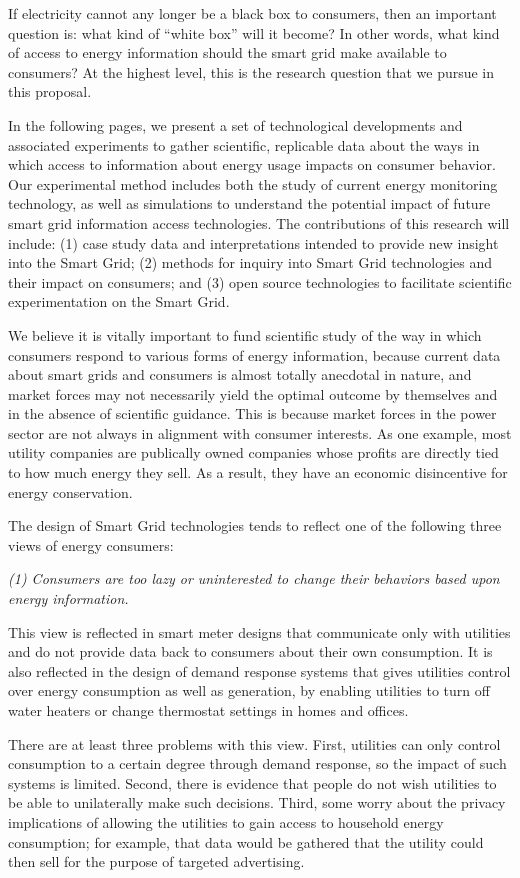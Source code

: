 If electricity cannot any longer be a black box to consumers, then an
important question is: what kind of ``white box'' will it become? In other
words, what kind of access to energy information should the smart grid make
available to consumers? At the highest level, this is the research question
that we pursue in this proposal.

In the following pages, we present a set of technological developments and
associated experiments to gather scientific, replicable data about the ways
in which access to information about energy usage impacts on consumer
behavior.  Our experimental method includes both the study of current
energy monitoring technology, as well as simulations to understand the
potential impact of future smart grid information access technologies.  The
contributions of this research will include: (1) case study data and
interpretations intended to provide new insight into the Smart Grid; (2)
methods for inquiry into Smart Grid technologies and their impact on
consumers; and (3) open source technologies to facilitate scientific
experimentation on the Smart Grid.

We believe it is vitally important to fund scientific study of the way in
which consumers respond to various forms of energy information, because
current data about smart grids and consumers is almost totally anecdotal in
nature, and market forces may not necessarily yield the optimal outcome by
themselves and in the absence of scientific guidance.  This is because
market forces in the power sector are not always in alignment with consumer
interests. As one example, most utility companies are publically owned
companies whose profits are directly tied to how much energy they sell.  As
a result, they have an economic disincentive for energy conservation.

The design of Smart Grid technologies tends to reflect one of the following
three views of energy consumers:

{\em (1) Consumers are too lazy or uninterested to change their 
behaviors based upon energy information.}

This view is reflected in smart meter designs that communicate only with
utilities and do not provide data back to consumers about their own
consumption. It is also reflected in the design of demand response systems
that gives utilities control over energy consumption as well as
generation, by enabling utilities to turn off water heaters or change
thermostat settings in homes and offices. 

There are at least three problems with this view. First, utilities can only
control consumption to a certain degree through demand response, so the
impact of such systems is limited.  Second, there is evidence that people
do not wish utilities to be able to unilaterally make such decisions.
Third, some worry about the privacy implications of allowing the utilities
to gain access to household energy consumption; for example, that data
would be gathered that the utility could then sell for the purpose of
targeted advertising.

